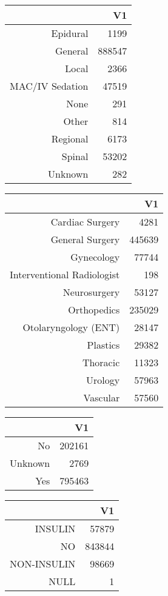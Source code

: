 \bigskip\bigskip
\centering
\begin{tabular}{rr}
  \hline
 & V1 \\ 
  \hline
Epidural & 1199 \\ 
  General & 888547 \\ 
  Local & 2366 \\ 
  MAC/IV Sedation & 47519 \\ 
  None & 291 \\ 
  Other & 814 \\ 
  Regional & 6173 \\ 
  Spinal & 53202 \\ 
  Unknown & 282 \\ 
   \hline
\end{tabular}

\bigskip\bigskip
\centering
\begin{tabular}{rr}
  \hline
 & V1 \\ 
  \hline
Cardiac Surgery & 4281 \\ 
  General Surgery & 445639 \\ 
  Gynecology & 77744 \\ 
  Interventional Radiologist & 198 \\ 
  Neurosurgery & 53127 \\ 
  Orthopedics & 235029 \\ 
  Otolaryngology (ENT) & 28147 \\ 
  Plastics & 29382 \\ 
  Thoracic & 11323 \\ 
  Urology & 57963 \\ 
  Vascular & 57560 \\ 
   \hline
\end{tabular}

\bigskip\bigskip
\centering
\begin{tabular}{rr}
  \hline
 & V1 \\ 
  \hline
No & 202161 \\ 
  Unknown & 2769 \\ 
  Yes & 795463 \\ 
   \hline
\end{tabular}

\bigskip\bigskip
\centering
\begin{tabular}{rr}
  \hline
 & V1 \\ 
  \hline
INSULIN & 57879 \\ 
  NO & 843844 \\ 
  NON-INSULIN & 98669 \\ 
  NULL &   1 \\ 
   \hline
\end{tabular}


